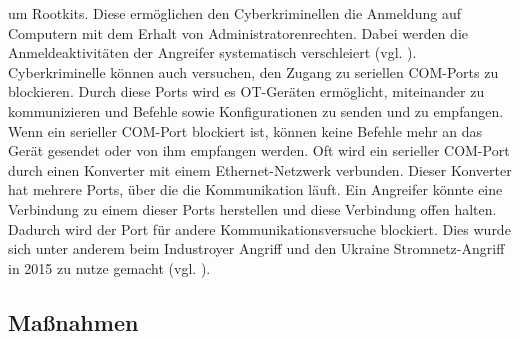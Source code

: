 um Rootkits. Diese ermöglichen den Cyberkriminellen die Anmeldung auf Computern mit dem Erhalt von Administratorenrechten. Dabei werden die Anmeldeaktivitäten der Angreifer systematisch verschleiert (vgl. \cite{Gdata}). Cyberkriminelle können auch versuchen, den Zugang zu seriellen COM-Ports zu blockieren. Durch diese Ports wird es OT-Geräten ermöglicht, miteinander zu kommunizieren und Befehle sowie Konfigurationen zu senden und zu empfangen. Wenn ein serieller COM-Port blockiert ist, können keine Befehle mehr an das Gerät gesendet oder von ihm empfangen werden. Oft wird ein serieller COM-Port durch einen Konverter mit einem Ethernet-Netzwerk verbunden. Dieser Konverter hat mehrere Ports, über die die Kommunikation läuft. Ein Angreifer könnte eine Verbindung zu einem dieser Ports herstellen und diese Verbindung offen halten. Dadurch wird der Port für andere Kommunikationsversuche blockiert. Dies wurde sich unter anderem beim Industroyer Angriff und den Ukraine Stromnetz-Angriff in 2015 zu nutze gemacht (vgl. \cite{mitre}).


\subsection{Maßnahmen}


